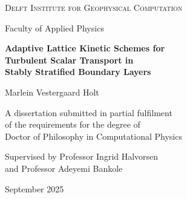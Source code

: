 \begin{titlepage}
\centering
\vspace*{2.2cm}

{\Large\scshape Delft Institute for Geophysical Computation}

\vspace{0.6cm}
{\large Faculty of Applied Physics}

\vspace{3.2cm}
{\huge\bfseries Adaptive Lattice Kinetic Schemes for\\[0.35cm]
Turbulent Scalar Transport in\\[0.35cm]
Stably Stratified Boundary Layers\par}

\vspace{2.4cm}
{\Large Marlein Vestergaard Holt}

\vspace{2.0cm}
{\large A dissertation submitted in partial fulfilment\\
of the requirements for the degree of\\
Doctor of Philosophy in Computational Physics}

\vfill
{\large Supervised by Professor Ingrid Halvorsen\\
and Professor Adeyemi Bankole}

\vspace{1.2cm}
{\large September 2025}

\end{titlepage}
